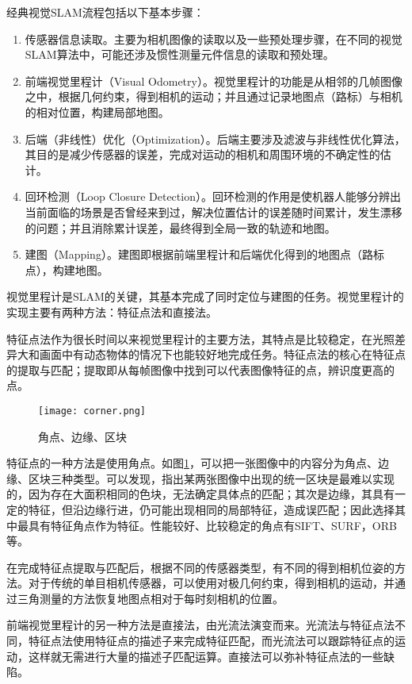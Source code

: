 经典视觉SLAM流程包括以下基本步骤：
\begin{enumerate}
	\item 
	传感器信息读取。主要为相机图像的读取以及一些预处理步骤，在不同的视觉SLAM算法中，可能还涉及惯性测量元件信息的读取和预处理。
	\item 
	前端视觉里程计（Visual Odometry）。视觉里程计的功能是从相邻的几帧图像之中，根据几何约束，得到相机的运动；并且通过记录地图点（路标）与相机的相对位置，构建局部地图。
	\item 
	后端（非线性）优化（Optimization）。后端主要涉及滤波与非线性优化算法，其目的是减少传感器的误差，完成对运动的相机和周围环境的不确定性的估计。
	\item 
	回环检测（Loop Closure Detection）。回环检测的作用是使机器人能够分辨出当前面临的场景是否曾经来到过，解决位置估计的误差随时间累计，发生漂移的问题；并且消除累计误差，最终得到全局一致的轨迹和地图。
	\item 
	建图（Mapping）。建图即根据前端里程计和后端优化得到的地图点（路标点），构建地图。
\end{enumerate}

视觉里程计是SLAM的关键，其基本完成了同时定位与建图的任务。视觉里程计的实现主要有两种方法：特征点法和直接法。

特征点法作为很长时间以来视觉里程计的主要方法，其特点是比较稳定，在光照差异大和画面中有动态物体的情况下也能较好地完成任务。特征点法的核心在特征点的提取与匹配；提取即从每帧图像中找到可以代表图像特征的点，辨识度更高的点。

\begin{figure}[!ht]
	\centering
	\texttt{[image: corner.png]}
	\caption{角点、边缘、区块} 
	\label{fig6}
\end{figure}

特征点的一种方法是使用角点。如图\ref{fig6}，可以把一张图像中的内容分为角点、边缘、区块三种类型。可以发现，指出某两张图像中出现的统一区块是最难以实现的，因为存在大面积相同的色块，无法确定具体点的匹配；其次是边缘，其具有一定的特征，但沿边缘行进，仍可能出现相同的局部特征，造成误匹配；因此选择其中最具有特征角点作为特征。性能较好、比较稳定的角点有SIFT、SURF，ORB等。

在完成特征点提取与匹配后，根据不同的传感器类型，有不同的得到相机位姿的方法。对于传统的单目相机传感器，可以使用对极几何约束，得到相机的运动，并通过三角测量的方法恢复地图点相对于每时刻相机的位置。

前端视觉里程计的另一种方法是直接法，由光流法演变而来。光流法与特征点法不同，特征点法使用特征点的描述子来完成特征匹配，而光流法可以跟踪特征点的运动，这样就无需进行大量的描述子匹配运算。直接法可以弥补特征点法的一些缺陷。


